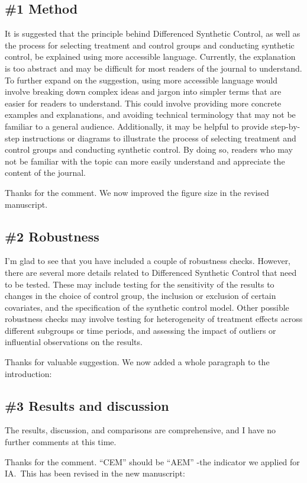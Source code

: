 \subsection{\#1 Method}
\RC{}  It is suggested that the principle behind Differenced Synthetic Control, as well as the process for selecting treatment and control groups and conducting synthetic control, be explained using more accessible language. Currently, the explanation is too abstract and may be difficult for most readers of the journal to understand. To further expand on the suggestion, using more accessible language would involve breaking down complex ideas and jargon into simpler terms that are easier for readers to understand. This could involve providing more concrete examples and explanations, and avoiding technical terminology that may not be familiar to a general audience. Additionally, it may be helpful to provide step-by-step instructions or diagrams to illustrate the process of selecting treatment and control groups and conducting synthetic control. By doing so, readers who may not be familiar with the topic can more easily understand and appreciate the content of the journal.

\AR{} Thanks for the comment. We now improved the figure size in the revised manuscript.

\subsection{\#2 Robustness}\label{sec:2-2}
\RC{} I'm glad to see that you have included a couple of robustness checks. However, there are several more details related to Differenced Synthetic Control that need to be tested. These may include testing for the sensitivity of the results to changes in the choice of control group, the inclusion or exclusion of certain covariates, and the specification of the synthetic control model. Other possible robustness checks may involve testing for heterogeneity of treatment effects across different subgroups or time periods, and assessing the impact of outliers or influential observations on the results.

\AR{} Thanks for valuable suggestion. We now added a whole paragraph to the introduction:

\subsection{\#3 Results and discussion}\label{sec:2-3}
\RC{} The results, discussion, and comparisons are comprehensive, and I have no further comments at this time.

\AR{} Thanks for the comment. ``CEM'' should be ``AEM'' -the indicator we applied for IA.\ This has been revised in the new manuscript:
